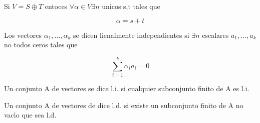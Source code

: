 					\begin{proposicion}
						Si $V= S \oplus T$ entoces $\forall \alpha \in V \exists n$ unicos s,t tales que 
					\end{proposicion}
							\begin{equation*}
								\alpha = s + t
							\end{equation*}
						\begin{definicion}
										Los vectores $\alpha_1 , \dots , \alpha_k$ se dicen lienalmente  independientes si $\exists n $ escalares $a_1 , \dots , a_k$ no todos ceros tales que 		
											\end{definicion}					
												\begin{equation*}
													\sum \limits_{i=1}^k \alpha_i a_i = 0
												\end{equation*}
						\begin{definicion}
							Un conjunto A de vectores se dice l.i. si cualquier subconjunto finito de A es l.i. 
						\end{definicion}
						\begin{definicion}
							Un conjunto A de vectores de dice l.d. si existe un subconjunto finito de A no vac\`io que sea l.d.
						\end{definicion}

